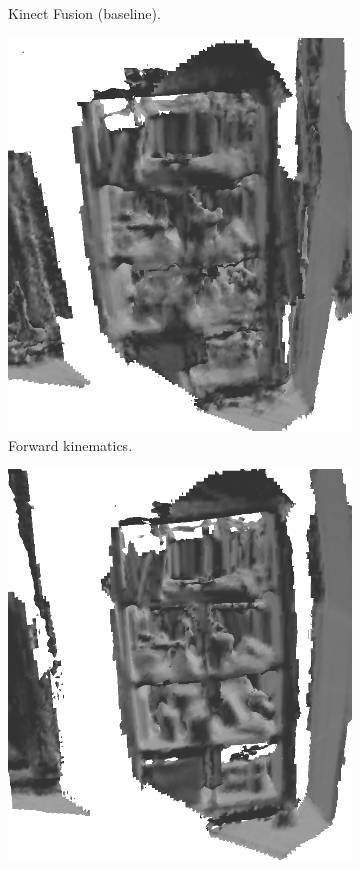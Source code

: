 \begin{figure}[width=0.5\columnwidth, ht]
\begin{subfigure}{0.29\columnwidth}
	 \caption{Kinect Fusion (baseline).}
	 \end{subfigure}
	\begin{subfigure}{0.29\columnwidth}
	\centering
	\includegraphics[width=1.0\textwidth]{img/arm_slam/lambert_bookshelf_notrack.png}
	\caption{Forward kinematics. }
	\end{subfigure}
	\begin{subfigure}{0.29\columnwidth}
	\centering 
	\includegraphics[width=1.0\textwidth]{img/arm_slam/lambert_bookshelf.png}

\end{subfigure}
\end{figure}
